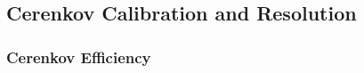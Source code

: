 \subsection{\label{sec:calib.cc}Cerenkov Calibration and Resolution}

\subsubsection{\label{sec:calib.cc.eff}Cerenkov Efficiency}

\FloatBarrier
